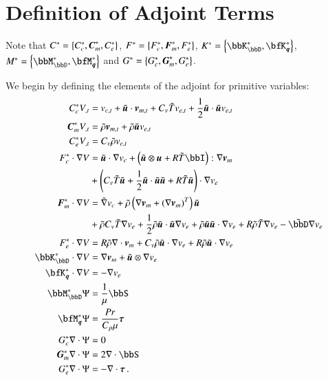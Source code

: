 \documentclass[preprint,12pt]{elsarticle}
\begin{document}
\section{Definition of Adjoint Terms}
\label{ap:adjoint}

Note that $C^*=\left\{ C^*_c,\boldsymbol C^*_m,C^*_e \right\}$, $F^*=\left\{ F^*_c,\boldsymbol F^*_m,F^*_e \right\}$, $K^*=\LRc{\bbK^*_\bbD,\bfK^*_{\bfq}}$, $M^*=\LRc{\bbM^*_\bbD,\bfM^*_{\bfq}}$
and $G^*=\left\{ G^*_c,\boldsymbol G^*_m,G^*_e \right\}$.

We begin by defining the elements of the adjoint for primitive variables:
\begin{align*}
C^*_cV_{,t}&=v_{c,t}+\tilde\bfu\cdot\bfv_{m,t}+C_v\tilde T v_{e,t}+\frac{1}{2}\tilde\bfu\cdot\tilde\bfu v_{e,t}\\
\bfC^*_mV_{,t}&=\tilde\rho\bfv_{m,t}+\tilde\rho\tilde\bfu v_{e,t}\\
C^*_eV_{,t}&=C_v\tilde\rho v_{e,t}\\
%
F^*_c\cdot\Grad V&=\tilde\bfu\cdot\Grad v_c
+\LRp{\tilde\bfu\otimes\bfu+R\tilde T\bbI}:\Grad\bfv_m\\
&+\LRp{C_v\tilde T\tilde\bfu+\frac{1}{2}\tilde\bfu\cdot\tilde\bfu\tilde\bfu+R\tilde T\tilde\bfu}\cdot\Grad v_e\\
\bfF^*_m\cdot\Grad V&=\tilde\Grad v_c
+\tilde\rho\LRp{\Grad\bfv_m+(\Grad\bfv_m)^T}\tilde\bfu\\
&+\tilde\rho C_v\tilde T\Grad v_e+\frac{1}{2}\tilde\rho\tilde\bfu\cdot\tilde\bfu\Grad v_e
+\tilde\rho\tilde\bfu\tilde\bfu\cdot\Grad v_e+R\tilde\rho\tilde T\Grad v_e
-\tilde\bbD\Grad v_e\\
F^*_e\cdot\Grad V&=R\tilde\rho\Div\bfv_m
+C_v\tilde\rho\tilde\bfu\cdot\Grad v_e+R\tilde\rho\tilde\bfu\cdot\Grad v_e\\
%
\bbK^*_\bbD\cdot\Grad V&=\Grad\bfv_m+\tilde\bfu\otimes\Grad v_e\\
\bfK^*_{\bfq}\cdot\Grad V&=-\Grad v_e\\
%
\bbM^*_\bbD\Psi&=\frac{1}{\mu}\bbS\\
\bfM^*_{\bfq}\Psi&=\frac{Pr}{C_p\mu}\bftau\\
%
G^*_c\Div\Psi&=0\\
\bfG^*_m\Div\Psi&=2\Div\bbS\\
G^*_e\Div\Psi&=-\Div\bftau\,.
\end{align*}
\end{document}
